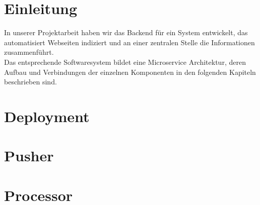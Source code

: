 
\chapter*{Einleitung}
{\large
In unserer Projektarbeit haben wir das Backend für ein System entwickelt, das automatisiert Webseiten indiziert und an einer zentralen Stelle die Informationen zusammenführt.\\
Das entsprechende Softwaresystem bildet eine Microservice Architektur, deren Aufbau und Verbindungen der einzelnen Komponenten in den folgenden Kapiteln beschrieben sind.
}

\chapter{Deployment}














\chapter{Pusher}


\chapter{Processor}



